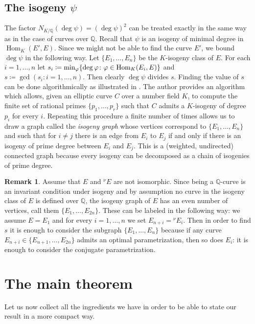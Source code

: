 \documentclass[11pt]{amsart}
\theoremstyle{definition}
\newtheorem{rmk}[definizione]{Remark}
\begin{document}
		\subsection{The isogeny \texorpdfstring{$\psi$}{}}
                \label{isogenygraph}

		The factor $N_{K/{\mathbb{Q}}}(\deg\psi)={(\deg\psi)}^2$ can be treated exactly in the same way as in the case of curves over ${\mathbb{Q}}$. Recall that $\psi$ is an isogeny of minimal degree in $\operatorname{Hom}_{K}(E',E)$. Since we might not be able to find the curve $E'$, we bound $\deg\psi$ in the following way. Let $\{E_1,\ldots,E_n\}$ be the $K$-isogeny class of $E$. For each $i=1,\ldots,n$ let ${\displaystyle} s_i\coloneqq \min_{\varphi}\{\deg\varphi\colon\varphi\in\operatorname{Hom}_K(E_i,E)\}$ and $s\coloneqq\gcd(s_i\colon i=1,\ldots,n)$. Then clearly $\deg\psi$ divides $s$. Finding the value of $s$ can be done algorithmically as illustrated in \cite{bil}. The author provides an algorithm which allows, given an elliptic curve $C$ over a number field $K$, to compute the finite set of rational primes $\{p_1,\ldots,p_r\}$ such that $C$ admits a $K$-isogeny of degree $p_i$ for every $i$. Repeating this procedure a finite number of times allows us to draw a graph called the \emph{isogeny graph} whose vertices correspond to $\{E_1,\ldots,E_ n\}$ and such that for $i\neq j$ there is an edge from $E_i$ to $E_j$ if and only if there is an isogeny of prime degree between $E_i$ and $E_j$. This is a (weighted, undirected) connected graph because every isogeny can be decomposed as a chain of isogenies of prime degree. 
		\begin{rmk}
			Assume that $E$ and ${{}^\nu\!} E$ are not isomorphic. Since being a ${\mathbb{Q}}$-curve is an invariant condition under isogeny and by assumption no curve in the isogeny class of $E$ is defined over ${\mathbb{Q}}$, the isogeny graph of $E$ has an even number of vertices, call them $\{E_1,\ldots,E_{2n}\}$. These can be labeled in the following way: we assume $E=E_1$ and for every $i=1,\ldots,n$ we set $E_{n+i}={{}^\nu\!} E_i$. Then in order to find $s$ it is enough to consider the subgraph $\{E_1,\ldots,E_n\}$ because if any curve $E_{n+i}\in\{E_{n+1},\ldots,E_{2n}\}$ admits an optimal parametrization, then so does $E_i$: it is enough to consider the conjugate parametrization.
		\end{rmk}

		\section{The main theorem}\label{mainsec}
		Let us now collect all the ingredients we have in order to be able to state our result in a more compact way.
\end{document}
